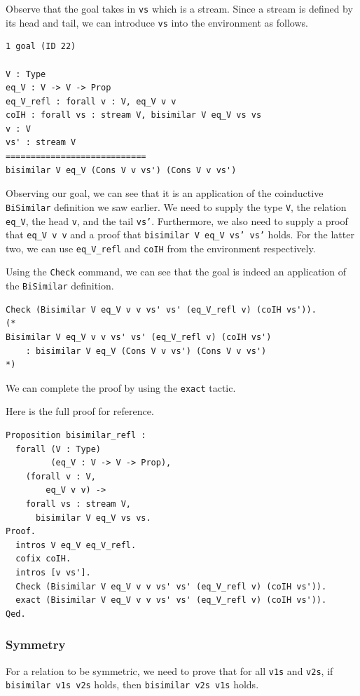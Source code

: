 \documentclass{article}
\begin{document}
Observe that the goal takes in \texttt{vs} which is a stream. Since a stream is defined by its head and tail, we can introduce \texttt{vs} into the environment as follows.

\begin{lstlisting}
1 goal (ID 22)

V : Type
eq_V : V -> V -> Prop
eq_V_refl : forall v : V, eq_V v v
coIH : forall vs : stream V, bisimilar V eq_V vs vs
v : V
vs' : stream V
============================
bisimilar V eq_V (Cons V v vs') (Cons V v vs')
\end{lstlisting}

Observing our goal, we can see that it is an application of the coinductive \texttt{BiSimilar} definition we saw earlier. We need to supply the type \texttt{V}, the relation \texttt{eq\_V}, the head \texttt{v}, and the tail \texttt{vs'}. Furthermore, we also need to supply a proof that \texttt{eq\_V v v} and a proof that \texttt{bisimilar V eq\_V vs' vs'} holds. For the latter two, we can use \texttt{eq\_V\_refl} and \texttt{coIH} from the environment respectively.

Using the \texttt{Check} command, we can see that the goal is indeed an application of the \texttt{BiSimilar} definition.

\begin{lstlisting}
Check (Bisimilar V eq_V v v vs' vs' (eq_V_refl v) (coIH vs')).
(*
Bisimilar V eq_V v v vs' vs' (eq_V_refl v) (coIH vs')
    : bisimilar V eq_V (Cons V v vs') (Cons V v vs')
*)
\end{lstlisting}

We can complete the proof by using the \texttt{exact} tactic.

Here is the full proof for reference.

\begin{lstlisting}
Proposition bisimilar_refl :
  forall (V : Type)
         (eq_V : V -> V -> Prop),
    (forall v : V,
        eq_V v v) ->
    forall vs : stream V,
      bisimilar V eq_V vs vs.
Proof.
  intros V eq_V eq_V_refl.
  cofix coIH.
  intros [v vs'].
  Check (Bisimilar V eq_V v v vs' vs' (eq_V_refl v) (coIH vs')).
  exact (Bisimilar V eq_V v v vs' vs' (eq_V_refl v) (coIH vs')).
Qed.
\end{lstlisting}

\subsubsection{Symmetry}

For a relation to be symmetric, we need to prove that for all \texttt{v1s} and \texttt{v2s}, if \texttt{bisimilar v1s v2s} holds, then \texttt{bisimilar v2s v1s} holds. 
\end{document}
